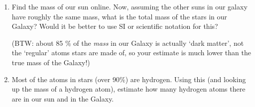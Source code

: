 \documentclass[12pt, letterpaper]{article}
\begin{document}
\begin{enumerate}
\item Find the mass of our sun online.  Now, assuming the other suns in our galaxy have roughly the same mass, what is the total mass of the stars in our Galaxy?  Would it be better to use SI or scientific notation for this?

(BTW: about 85 \% of the \emph{mass} in our Galaxy is actually `dark matter', not the `regular' atoms stars are made of, so your estimate is much lower than the true mass of the Galaxy!) 

\answergrid{7cm}

\item Most of the atoms in stars (over 90\%) are hydrogen.  Using this (and looking up the mass of a hydrogen atom), estimate how many hydrogen atoms there are in our sun and in the Galaxy.

\fillanswergrid

%

%
%
\end{enumerate}

\fillgrid 
\end{document}
